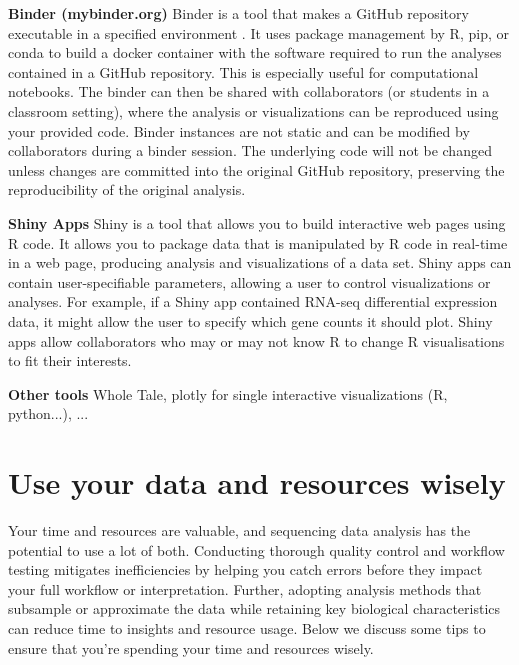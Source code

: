 \documentclass[10pt,letterpaper]{article}
\begin{document}
\begin{greybox}{
 \textbf{Binder (mybinder.org)} Binder is a tool that makes a GitHub repository executable in a specified environment \cite{Jupyter2018}. 
It uses package management by R, pip, or conda to build a docker container with the software required to run the analyses contained in a GitHub repository. 
This is especially useful for computational notebooks. 
The binder can then be shared with collaborators (or students in a classroom setting), where the analysis or visualizations can be reproduced using your provided code. 
Binder instances are not static and can be modified by collaborators during a binder session. 
The underlying code will not be changed unless changes are committed into the original GitHub repository, preserving the reproducibility of the original analysis.
 
 \textbf{Shiny Apps} Shiny is a tool that allows you to build interactive web pages using R code. 
It allows you to package data that is manipulated  by R code in real-time in a web page, producing analysis and visualizations of a data set. 
Shiny apps can contain user-specifiable parameters, allowing a user to control visualizations or analyses. 
For example, if a Shiny app contained RNA-seq differential expression data, it might allow the user to specify which gene counts it should plot. 
Shiny apps allow collaborators who may or may not know R to change R visualisations to fit their interests.   
 
 \textbf{Other tools} Whole Tale, plotly for single interactive visualizations (R, python...), ...
 

}
\end{greybox}

\section*{Use your data and resources wisely}

Your time and resources are valuable, and sequencing data analysis has the potential to use a lot of both. 
Conducting thorough quality control and workflow testing mitigates inefficiencies by helping you catch errors before they impact your full workflow or interpretation. 
Further, adopting analysis methods that subsample or approximate the data while retaining key biological characteristics can reduce time to insights and resource usage.
Below we discuss some tips to ensure that you're spending your time and resources wisely. 
\end{document}
